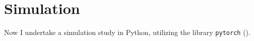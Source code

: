 \section{Simulation}
\label{sec:simulation}

Now I undertake a simulation study in Python, utilizing the library \texttt{pytorch} (\textcite{Ansel_PyTorch_2_Faster_2024}).